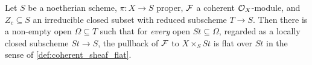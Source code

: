 \begin{lemma}

\leanok
  \label{lem:flat_stratum_component}
  Let \(S\) be a noetherian scheme, \(\pi : X \to S\) proper, \(\mathcal{F}\) a
  coherent \(\mathcal{O}_X\)-module, and \(Z_c \subseteq S\) an irreducible closed
  subset with reduced subscheme \(T \to S\).  Then there is a non-empty open
  \(\Omega \subseteq T\) such that for \emph{every} open
  \(\mathit{St} \subseteq \Omega\), regarded as a locally closed subscheme
  \(\mathit{St} \to S\), the pullback of \(\mathcal{F}\) to
  \(X \times_S \mathit{St}\) is flat over \(\mathit{St}\) in the sense of
  \cref{def:coherent_sheaf_flat}.
\end{lemma}

